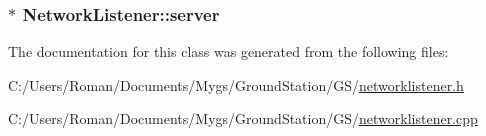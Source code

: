 \subsubsection[{server}]{$\ast$ Network\+Listener\+::server}\label{class_network_listener_a18b48fbd5b2df44baa73e4b332981a56}


The documentation for this class was generated from the following files\+:\begin{DoxyCompactItemize}
\item 
C\+:/\+Users/\+Roman/\+Documents/\+Mygs/\+Ground\+Station/\+G\+S/\hyperlink{networklistener_8h}{networklistener.\+h}\item 
C\+:/\+Users/\+Roman/\+Documents/\+Mygs/\+Ground\+Station/\+G\+S/\hyperlink{networklistener_8cpp}{networklistener.\+cpp}\end{DoxyCompactItemize}
